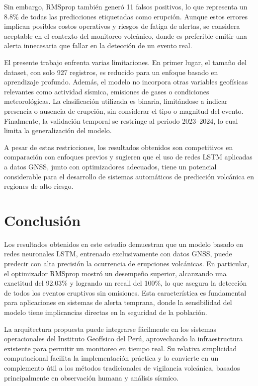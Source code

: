 \documentclass[conference]{IEEEtran}
\begin{document}
Sin embargo, RMSprop también generó 11 falsos positivos, lo que representa un 8.8\% de todas las predicciones etiquetadas como erupción. Aunque estos errores implican posibles costos operativos y riesgos de fatiga de alertas, se considera aceptable en el contexto del monitoreo volcánico, donde es preferible emitir una alerta innecesaria que fallar en la detección de un evento real.

El presente trabajo enfrenta varias limitaciones. En primer lugar, el tamaño del dataset, con solo 927 registros, es reducido para un enfoque basado en aprendizaje profundo. Además, el modelo no incorpora otras variables geofísicas relevantes como actividad sísmica, emisiones de gases o condiciones meteorológicas. La clasificación utilizada es binaria, limitándose a indicar presencia o ausencia de erupción, sin considerar el tipo o magnitud del evento. Finalmente, la validación temporal se restringe al periodo 2023–2024, lo cual limita la generalización del modelo.

A pesar de estas restricciones, los resultados obtenidos son competitivos en comparación con enfoques previos y sugieren que el uso de redes LSTM aplicadas a datos GNSS, junto con optimizadores adecuados, tiene un potencial considerable para el desarrollo de sistemas automáticos de predicción volcánica en regiones de alto riesgo.


\section{Conclusión}

Los resultados obtenidos en este estudio demuestran que un modelo basado en redes neuronales LSTM, entrenado exclusivamente con datos GNSS, puede predecir con alta precisión la ocurrencia de erupciones volcánicas. En particular, el optimizador RMSprop mostró un desempeño superior, alcanzando una exactitud del 92.03\% y logrando un recall del 100\%, lo que asegura la detección de todos los eventos eruptivos sin omisiones. Esta característica es fundamental para aplicaciones en sistemas de alerta temprana, donde la sensibilidad del modelo tiene implicancias directas en la seguridad de la población.

La arquitectura propuesta puede integrarse fácilmente en los sistemas operacionales del Instituto Geofísico del Perú, aprovechando la infraestructura existente para permitir un monitoreo en tiempo real. Su relativa simplicidad computacional facilita la implementación práctica y lo convierte en un complemento útil a los métodos tradicionales de vigilancia volcánica, basados principalmente en observación humana y análisis sísmico.
\end{document}
